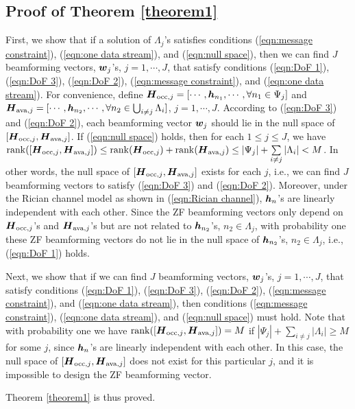 \documentclass[onecolumn, draftclsnofoot, 12pt]{IEEEtran}
\newcommand{\mv}[1]{\mbox{\boldmath{$ #1 $}}}
\begin{document}
\begin{appendix}
\subsection{Proof of Theorem \ref{theorem1}}\label{appendix1}
First, we show that if a solution of $\Lambda_j$'s satisfies conditions (\ref{eqn:message constraint}), (\ref{eqn:one data stream}), and (\ref{eqn:null space}), then we can find $J$ beamforming vectors, $\mv{w}_j$'s, $j=1,\cdots,J$, that satisfy conditions (\ref{eqn:DoF 1}), (\ref{eqn:DoF 3}), (\ref{eqn:DoF 2}), (\ref{eqn:message constraint}), and (\ref{eqn:one data stream}). For convenience, define $\mv{H}_{{\rm occ},j}=[\cdots,\mv{h}_{n_1},\cdots,\forall n_1\in \Psi_j]$ and $\mv{H}_{{\rm ava},j}=[\cdots,\mv{h}_{n_2},\cdots,\forall n_2\in \bigcup_{i\neq j}\Lambda_i]$, $j=1,\cdots,J$. According to (\ref{eqn:DoF 3}) and (\ref{eqn:DoF 2}), each beamforming vector $\mv{w}_j$ should lie in the null space of $[\mv{H}_{{\rm occ},j},\mv{H}_{{\rm ava},j}]$. If (\ref{eqn:null space}) holds, then for each $1\leq j \leq J$, we have ${\rm rank}([\mv{H}_{{\rm occ},j},\mv{H}_{{\rm ava},j}])\leq {\rm rank}(\mv{H}_{{\rm occ},j})+{\rm rank}(\mv{H}_{{\rm ava},j})\leq |\Psi_j|+\sum\limits_{i\neq j}|\Lambda_i|<M$. In other words, the null space of $[\mv{H}_{{\rm occ},j},\mv{H}_{{\rm ava},j}]$ exists for each $j$, i.e., we can find $J$ beamforming vectors to satisfy (\ref{eqn:DoF 3}) and (\ref{eqn:DoF 2}). Moreover, under the Rician channel model as shown in (\ref{eqn:Rician channel}), $\mv{h}_n$'s are linearly independent with each other. Since the ZF beamforming vectors only depend on $\mv{H}_{{\rm occ},j}$'s and $\mv{H}_{{\rm ava},j}$'s but are not related to $\mv{h}_{n_2}$'s, $n_2\in \Lambda_j$, with probability one these ZF beamforming vectors do not lie in the null space of $\mv{h}_{n_2}$'s, $n_2\in \Lambda_j$, i.e., (\ref{eqn:DoF 1}) holds.

Next, we show that if we can find $J$ beamforming vectors, $\mv{w}_j$'s, $j=1,\cdots,J$, that satisfy conditions (\ref{eqn:DoF 1}), (\ref{eqn:DoF 3}), (\ref{eqn:DoF 2}), (\ref{eqn:message constraint}), and (\ref{eqn:one data stream}), then conditions (\ref{eqn:message constraint}), (\ref{eqn:one data stream}), and (\ref{eqn:null space}) must hold. Note that with probability one we have ${\rm rank}([\mv{H}_{{\rm occ},j},\mv{H}_{{\rm ava},j}])=M$ if $|\Psi_j|+\sum\limits_{i\neq j}|\Lambda_i|\geq M$ for some $j$, since $\mv{h}_n$'s are linearly independent with each other. In this case, the null space of $[\mv{H}_{{\rm occ},j},\mv{H}_{{\rm ava},j}]$ does not exist for this particular $j$, and it is impossible to design the ZF beamforming vector.

Theorem \ref{theorem1} is thus proved. 


\end{appendix}



\end{document}
